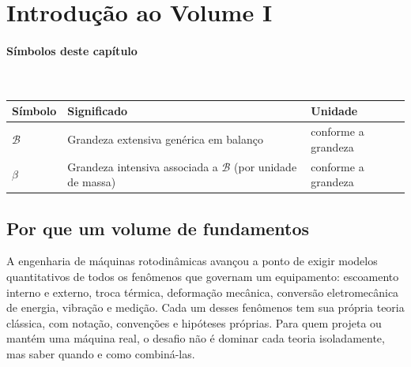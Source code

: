 \documentclass[12pt,a4paper]{article}
\numberwithin{equation}{section}
\numberwithin{table}{section}
\numberwithin{figure}{section}
\begin{document}
\setcounter{section}{0}
\renewcommand{\theHsection}{v1.\arabic{section}}
\renewcommand{\theHequation}{v1.\theequation}
\renewcommand{\theHfigure}{v1.\thefigure}
\renewcommand{\theHtable}{v1.\thetable}
	

	


	\newpage
	\newpage



\section{Introdução ao Volume I}

\paragraph{Símbolos deste capítulo}\mbox{}\\[-0.5em]
{\small
\begin{longtable}{>{\raggedright\arraybackslash}p{2.6cm} >{\raggedright\arraybackslash}p{9.2cm} >{\raggedright\arraybackslash}p{2.6cm}}
	\toprule
	\textbf{Símbolo} & \textbf{Significado} & \textbf{Unidade} \\ \midrule
	\endhead
	$\mathcal{B}$ & Grandeza extensiva genérica em balanço & conforme a grandeza \\
	$\beta$ & Grandeza intensiva associada a $\mathcal{B}$ (por unidade de massa) & conforme a grandeza \\
	\bottomrule
\end{longtable}
}




\subsection{Por que um volume de fundamentos}

A engenharia de máquinas rotodinâmicas avançou a ponto de exigir modelos
quantitativos de todos os fenômenos que governam um equipamento: escoamento
interno e externo, troca térmica, deformação mecânica, conversão
eletromecânica de energia, vibração e medição. Cada um desses fenômenos tem
sua própria teoria clássica, com notação, convenções e hipóteses próprias.
Para quem projeta ou mantém uma máquina real, o desafio não é dominar cada
teoria isoladamente, mas saber quando e como combiná-las.
\end{document}
